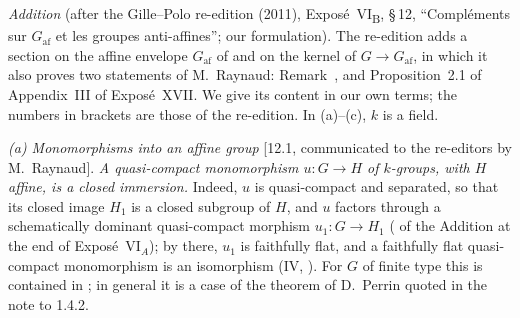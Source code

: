 

\par\bigskip\noindent{}\label{sec:sga3-VIB-12}%
\emph{Addition} (after the Gille--Polo re-edition (2011), Expos\'e~VI\textsubscript{B},
\S\,12, ``Compl\'ements sur \(G_{\mathrm{af}}\) et les groupes anti-affines''; our
formulation). The re-edition adds a section on the affine envelope \(G_{\mathrm{af}}\) of
 and on the kernel of \(G\to G_{\mathrm{af}}\), in which it
also proves two statements of M.~Raynaud: Remark~, and
Proposition~2.1 of Appendix~III of Expos\'e~XVII. We give its content in our own terms; the
numbers in brackets are those of the re-edition. In (a)--(c), \(k\) is a field.

\par\smallskip\noindent\textit{(a) Monomorphisms into an affine group} [12.1, communicated to
the re-editors by M.~Raynaud]. \emph{A quasi-compact monomorphism \(u:G\to H\) of
\(k\)-groups, with \(H\) affine, is a closed immersion.} Indeed, \(u\) is quasi-compact and
separated, so that its closed image \(H_1\) is a closed subgroup of \(H\), and \(u\) factors
through a schematically dominant quasi-compact morphism \(u_1:G\to H_1\)
( of the Addition at the end of Expos\'e~VI\(_A\)); by
 there, \(u_1\) is faithfully flat, and a faithfully flat
quasi-compact monomorphism is an isomorphism (IV, ). For
\(G\) of finite type this is contained in ; in general it
is a case of the theorem of D.~Perrin quoted in the note to 1.4.2.

